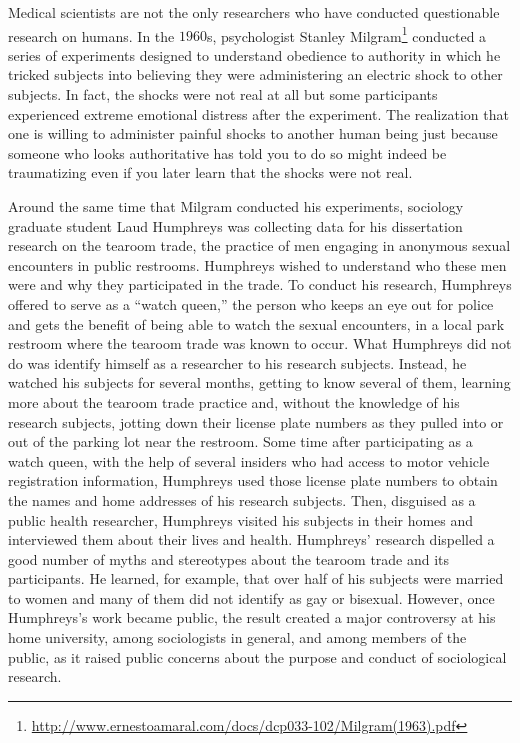 Medical scientists are not the only researchers who have conducted questionable research on humans. In the $ 1960 $s, psychologist Stanley Milgram\footnote{\url{http://www.ernestoamaral.com/docs/dcp033-102/Milgram(1963).pdf}} conducted a series of experiments designed to understand obedience to authority in which he tricked subjects into believing they were administering an electric shock to other subjects. In fact, the shocks were not real at all but some participants experienced extreme emotional distress after the experiment. The realization that one is willing to administer painful shocks to another human being just because someone who looks authoritative has told you to do so might indeed be traumatizing even if you later learn that the shocks were not real.

Around the same time that Milgram conducted his experiments, sociology graduate student Laud Humphreys\cite{humphreys1970tearoom} was collecting data for his dissertation research on the tearoom trade, the practice of men engaging in anonymous sexual encounters in public restrooms. Humphreys wished to understand who these men were and why they participated in the trade. To conduct his research, Humphreys offered to serve as a ``watch queen,'' the person who keeps an eye out for police and gets the benefit of being able to watch the sexual encounters, in a local park restroom where the tearoom trade was known to occur. What Humphreys did not do was identify himself as a researcher to his research subjects. Instead, he watched his subjects for several months, getting to know several of them, learning more about the tearoom trade practice and, without the knowledge of his research subjects, jotting down their license plate numbers as they pulled into or out of the parking lot near the restroom. Some time after participating as a watch queen, with the help of several insiders who had access to motor vehicle registration information, Humphreys used those license plate numbers to obtain the names and home addresses of his research subjects. Then, disguised as a public health researcher, Humphreys visited his subjects in their homes and interviewed them about their lives and health. Humphreys' research dispelled a good number of myths and stereotypes about the tearoom trade and its participants. He learned, for example, that over half of his subjects were married to women and many of them did not identify as gay or bisexual. However, once Humphreys’s work became public, the result created a major controversy at his home university, among sociologists in general, and among members of the public, as it raised public concerns about the purpose and conduct of sociological research.

